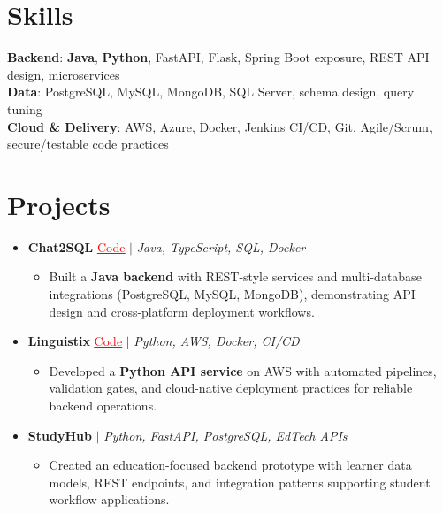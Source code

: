 \documentclass[letterpaper,10pt]{article}
\newcommand{\resumeItem}[1]{\item\small{{#1 \vspace{-2pt}}}}
\newcommand{\resumeProjectHeading}[1]{\item \small #1 \vspace{-2pt}}
\newcommand{\resumeSubHeadingListStart}{\begin{itemize}[leftmargin=0.0in, label={}]}
\newcommand{\resumeSubHeadingListEnd}{\end{itemize}}
\newcommand{\resumeProjItemListStart}{\begin{itemize}[leftmargin=0.15in,label=\textbullet,itemsep=0pt,topsep=0pt,parsep=0pt,partopsep=0pt]}
\newcommand{\resumeProjItemListEnd}{\end{itemize}\vspace{-4pt}}
\begin{document}
\section{Skills}
\begin{itemize}[leftmargin=0.15in, label={}]
\small{\item{
\textbf{Backend}: \textbf{Java}, \textbf{Python}, FastAPI, Flask, Spring Boot exposure, REST API design, microservices \\
\textbf{Data}: PostgreSQL, MySQL, MongoDB, SQL Server, schema design, query tuning \\
\textbf{Cloud \& Delivery}: AWS, Azure, Docker, Jenkins CI/CD, Git, Agile/Scrum, secure/testable code practices
}}
\end{itemize}
\vspace{-16pt}
\section{Projects}
\resumeSubHeadingListStart
\vspace{-2pt}
\resumeProjectHeading{\textbf{Chat2SQL} {\href{https://github.com/SAHAJ-BHADJA/Chat2SQL}{\textcolor{red}{\underline{Code}}}} $|$ \emph{Java, TypeScript, SQL, Docker}}
\resumeProjItemListStart
\resumeItem{Built a \textbf{Java backend} with REST-style services and multi-database integrations (PostgreSQL, MySQL, MongoDB), demonstrating API design and cross-platform deployment workflows.}
\resumeProjItemListEnd
\vspace{3pt}
\resumeProjectHeading{\textbf{Linguistix} {\href{https://github.com/SAHAJ-BHADJA/Linguistix}{\textcolor{red}{\underline{Code}}}} $|$ \emph{Python, AWS, Docker, CI/CD}}
\resumeProjItemListStart
\resumeItem{Developed a \textbf{Python API service} on AWS with automated pipelines, validation gates, and cloud-native deployment practices for reliable backend operations.}
\resumeProjItemListEnd
\vspace{3pt}
\resumeProjectHeading{\textbf{StudyHub} $|$ \emph{Python, FastAPI, PostgreSQL, EdTech APIs}}
\resumeProjItemListStart
\resumeItem{Created an education-focused backend prototype with learner data models, REST endpoints, and integration patterns supporting student workflow applications.}
\resumeProjItemListEnd
\resumeSubHeadingListEnd
\end{document}
